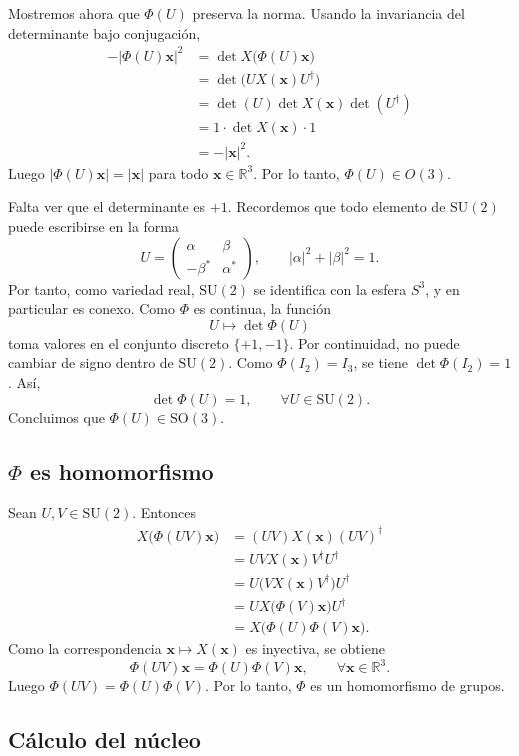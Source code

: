 \documentclass[11pt,a4paper]{article}
\newcommand{\R}{\mathbb{R}}
\newcommand{\SU}{\mathrm{SU}}
\newcommand{\SO}{\mathrm{SO}}
\newcommand{\vect}[1]{\boldsymbol{#1}}
\begin{document}
Mostremos ahora que $\Phi(U)$ preserva la norma. Usando la invariancia del determinante bajo conjugación,
\begin{align*}
-|\Phi(U)\vect x|^2
&=\det X\bigl(\Phi(U)\vect x\bigr)\\
&=\det\bigl(UX(\vect x)U^\dagger\bigr)\\
&=\det(U)\det X(\vect x)\det(U^\dagger)\\
&=1\cdot\det X(\vect x)\cdot1\\
&=-|\vect x|^2.
\end{align*}
Luego $|\Phi(U)\vect x|=|\vect x|$ para todo $\vect x\in\R^3$. Por lo tanto, $\Phi(U)\in O(3)$.

Falta ver que el determinante es $+1$. Recordemos que todo elemento de $\SU(2)$ puede escribirse en la forma
\[
U=\begin{pmatrix}\alpha&\beta\\-\beta^*&\alpha^*\end{pmatrix},
\qquad |\alpha|^2+|\beta|^2=1.
\]
Por tanto, como variedad real, $\SU(2)$ se identifica con la esfera $S^3$, y en particular es conexo. Como $\Phi$ es continua, la función
\[
U\longmapsto\det\Phi(U)
\]
toma valores en el conjunto discreto $\{+1,-1\}$. Por continuidad, no puede cambiar de signo dentro de $\SU(2)$. Como $\Phi(I_2)=I_3$, se tiene $\det\Phi(I_2)=1$. Así,
\[
\det\Phi(U)=1,\qquad \forall U\in\SU(2).
\]
Concluimos que $\Phi(U)\in\SO(3)$.

\subsection*{$\Phi$ es homomorfismo}

Sean $U,V\in\SU(2)$. Entonces
\begin{align*}
X\bigl(\Phi(UV)\vect x\bigr)
&=(UV)X(\vect x)(UV)^\dagger\\
&=UVX(\vect x)V^\dagger U^\dagger\\
&=U\bigl(VX(\vect x)V^\dagger\bigr)U^\dagger\\
&=UX\bigl(\Phi(V)\vect x\bigr)U^\dagger\\
&=X\bigl(\Phi(U)\Phi(V)\vect x\bigr).
\end{align*}
Como la correspondencia $\vect x\mapsto X(\vect x)$ es inyectiva, se obtiene
\[
\Phi(UV)\vect x=\Phi(U)\Phi(V)\vect x,\qquad \forall\vect x\in\R^3.
\]
Luego $\Phi(UV)=\Phi(U)\Phi(V)$. Por lo tanto, $\Phi$ es un homomorfismo de grupos.

\subsection*{Cálculo del núcleo}
\end{document}
